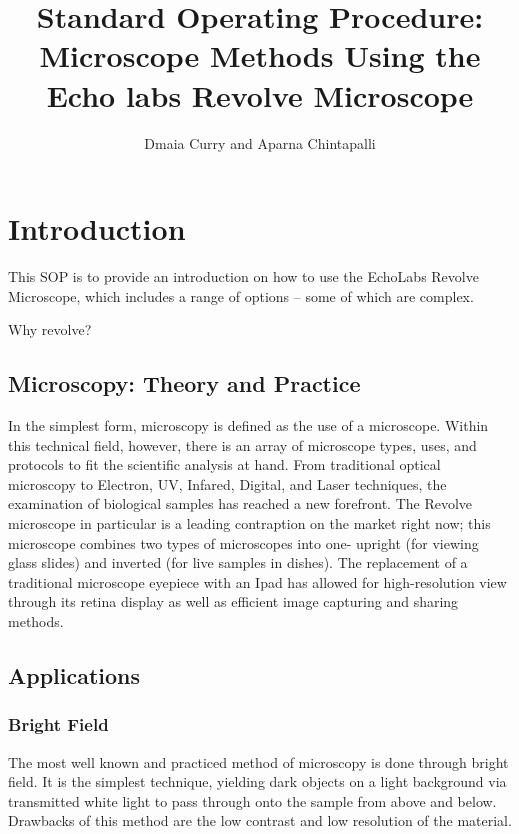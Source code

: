 \documentclass{article}
\title{Standard Operating Procedure: Microscope Methods Using the Echo labs Revolve Microscope}
\author{Dmaia Curry and Aparna Chintapalli}
\begin{document}


\maketitle

\section{Introduction}

This SOP is to provide an introduction on how to use the EchoLabs Revolve Microscope, which includes a range of options -- some of which are complex.

Why revolve?

\subsection{Microscopy: Theory and Practice}

In the simplest form, microscopy is defined as the use of a microscope. Within this technical field, however, there is an array of microscope types, uses, and protocols to fit the scientific analysis at hand. From traditional optical microscopy to Electron, UV, Infared, Digital, and Laser techniques, the examination of biological samples has reached a new forefront. The Revolve microscope in particular is a leading contraption on the market right now; this microscope combines two types of microscopes into one- upright (for viewing glass slides) and inverted (for live samples in dishes). The replacement of a traditional microscope eyepiece with an Ipad has allowed for high-resolution view through its retina display as well as efficient image capturing and sharing methods.

\subsection {Applications}

\subsubsection{Bright Field}
The most well known and practiced method of microscopy is done through bright field. It is the simplest technique, yielding dark objects on a light background via transmitted white light to pass through onto the sample from above and below. Drawbacks of this method are the low contrast and low resolution of the material. 
\end{document}
